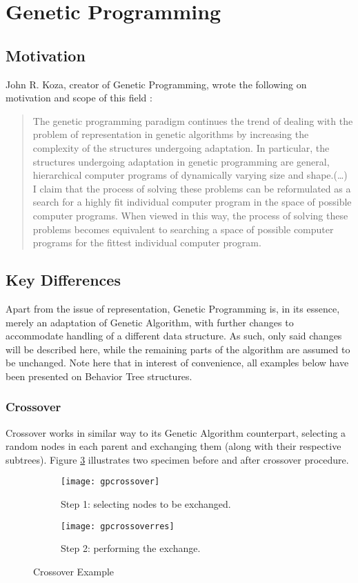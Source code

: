 \section{Genetic Programming}
\subsection{Motivation}
John R. Koza, creator of Genetic Programming, wrote the following on motivation and scope of this field \cite{kozagp}:
\begin{quote}
    The genetic programming paradigm continues the trend of dealing with the problem of representation in genetic algorithms by increasing the complexity of the structures undergoing adaptation. In particular, the structures undergoing adaptation in genetic programming are general, hierarchical computer programs of dynamically varying size and shape.(\ldots)
I claim that the process of solving these problems can be reformulated as a search for a highly fit individual computer program in the space of possible computer programs. When viewed in this way, the process of solving these problems becomes equivalent to searching a space of possible computer programs for the fittest individual computer program.
\end{quote}

\subsection{Key Differences}
Apart from the issue of representation, Genetic Programming is, in its essence, merely an adaptation of Genetic Algorithm, with further changes to accommodate handling of a different data structure. As such, only said changes will be described here, while the remaining parts of the algorithm are assumed to be unchanged. Note here that in interest of convenience, all examples below have been presented on Behavior Tree structures.
\subsubsection{Crossover}
Crossover works in similar way to its Genetic Algorithm counterpart, selecting a random nodes in each parent and exchanging them (along with their respective subtrees). Figure \ref{fig:x gpcrossoverexample} illustrates two specimen before and after crossover procedure.
\begin{figure}[h]
    \centering
    \begin{subfigure}[b]{0.5\textwidth}
        \centering
        \texttt{[image: gpcrossover]}
        \caption{Step 1: selecting nodes to be exchanged.}
        \label{fig:gpcrossover1}
    \end{subfigure}
    \hfill
    \begin{subfigure}[b]{0.5\textwidth}
        \centering
        \texttt{[image: gpcrossoverres]}
        \caption{Step 2: performing the exchange.}
        \label{fig:gpcrossover2}
    \end{subfigure}
    \caption{Crossover Example}
    \label{fig:x gpcrossoverexample}
\end{figure}
